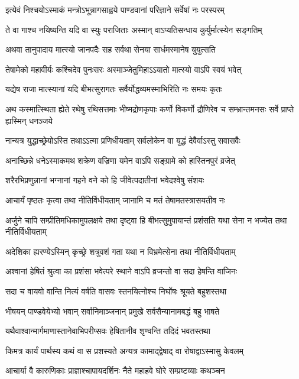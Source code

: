 \twolineshloka
{इत्येवं निश्चयोऽस्माकं मन्त्रोऽभून्नागसाह्वये}
{पाण्डवानां परिज्ञाने सर्वेषां नः परस्परम्}


\twolineshloka
{ते वा गाश्च नयिष्यन्ति यदि वा स्युः पराजिताः}
{अस्मान् वाऽप्यतिसन्धाय कुर्युर्मात्स्येन सङ्गतिम्}


\twolineshloka
{अथवा तानुपादाय मात्स्यो जानपदैः सह}
{सर्वथा सेनया सार्धमस्मानेष युयुत्सति}


\twolineshloka
{तेषामेको महावीर्यः कश्चिदेव पुनःसरः}
{अस्माञ्जेतुमिहाऽऽयातो मात्स्यो वाऽपि स्वयं भवेत्}


\twolineshloka
{यद्येष राजा मात्स्यानां यदि बीभत्सुरागतः}
{सर्वैर्योद्धव्यमस्माभिरिति नः समयः कृतः}


\threelineshloka
{अथ कस्मात्स्थिता ह्येते रथेषु रथिसत्तमाः}
{भीष्मद्रोणकृपाः कर्णो विकर्णो द्रौणिरेव च}
{सम्भ्रान्तमनसः सर्वे प्राप्ते ह्यस्मिन् धनञ्जये}


\twolineshloka
{नान्यत्र युद्धाच्छ्रेयोऽस्ति तथाऽऽत्मा प्रणिधीयताम्}
{सर्वलोकेन वा युद्धं देवैर्वाऽस्तु सवासवैः}


\twolineshloka
{अनाच्छिन्ने धनेऽस्माकमथ शक्रेण वज्रिणा}
{यमेन वाऽपि सङ्ग्रामे को हास्तिनपुरं व्रजेत्}


\twolineshloka
{शरैरभिप्रणुन्नानां भग्नानां गहने वने}
{को हि जीवेत्पदातीनां भवेदश्वेषु संशयः}


\twolineshloka
{आचार्यं पृष्ठतः कृत्वा तथा नीतिर्विधीयताम्}
{जानामि च मतं तेषामतस्त्रासयतीव नः}


\threelineshloka
{अर्जुने चापि सम्प्रीतिमधिकामुपलक्षये}
{तथा दृष्ट्वा हि बीभत्सुमुपायान्तं प्रशंसति}
{यथा सेना न भज्येत तथा नीतिर्विधीयताम्}


\twolineshloka
{अदेशिका ह्यरण्येऽस्मिन् कृच्छ्रे शत्रुवशं गता}
{यथा न विभ्रमेत्सेना तथा नीतिर्विधीयताम्}


\twolineshloka
{अश्वानां हेषितं श्रुत्वा का प्रशंसा भवेत्परे}
{स्थाने वाऽपि व्रजन्तो वा सदा हेषन्ति वाजिनः}


\twolineshloka
{सदा च वायवो वान्ति नित्यं वर्षति वासवः}
{स्तनयित्नोश्च निर्घोषः श्रूयते बहुशस्तथा}


\twolineshloka
{भीषयन् पाण्डवेयेभ्यो भवान् सर्वानिमाञ्जनान्}
{प्रमुखे सर्वसैन्यानामबद्धं बहु भाषते}


\twolineshloka
{यथैवाश्वान्मार्गमाणास्तानेवाभिपरीप्सवः}
{हेषितानीव शृण्वन्ति तदिदं भवतस्तथा}


\twolineshloka
{किमत्र कार्यं पार्थस्य कथं वा स प्रशस्यते}
{अन्यत्र कामाद्द्वेषाद् वा रोषाद्वाऽस्मासु केवलम्}


\twolineshloka
{आचार्या वै कारुणिकाः प्राज्ञाश्चापायदर्शिनः}
{नैते महाहवे घोरे सम्प्रष्टव्याः कथञ्चन}


